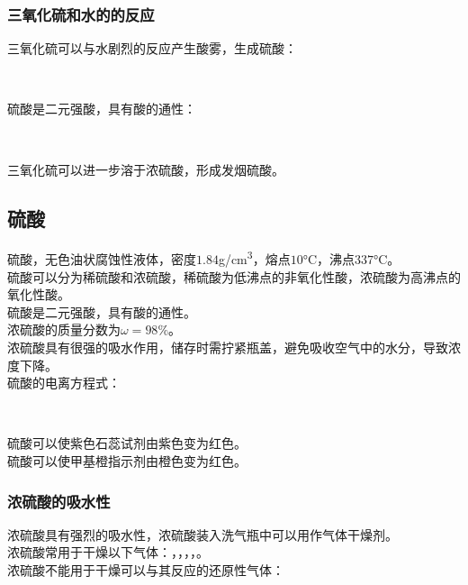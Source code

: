 \documentclass[UTF8]{ctexart}
\begin{document}
\subsubsection{三氧化硫和水的的反应}
    三氧化硫可以与水剧烈的反应产生酸雾，生成硫酸：
    \begin{center}
        \\[6mm]
    \end{center}
    硫酸是二元强酸，具有酸的通性：
    \begin{center}
        \\[6mm]
    \end{center}
    三氧化硫可以进一步溶于浓硫酸，形成发烟硫酸。

\newpage

\subsection{硫酸}
    硫酸，无色油状腐蚀性液体，密度$1.84$\si{g/cm^3}，熔点$10$\si{\degreeCelsius}，沸点$337$\si{\degreeCelsius}。\\[3mm]
    硫酸可以分为稀硫酸和浓硫酸，稀硫酸为低沸点的非氧化性酸，浓硫酸为高沸点的氧化性酸。\\[3mm]
    硫酸是二元强酸，具有酸的通性。\\[6mm]
    浓硫酸的质量分数为$\omega=98\%$。\\[3mm]
    浓硫酸具有很强的吸水作用，储存时需拧紧瓶盖，避免吸收空气中的水分，导致浓度下降。\\[6mm]
    硫酸的电离方程式：
    \begin{center}
        \\[4mm]
    \end{center}
    硫酸可以使紫色石蕊试剂由紫色变为红色。\\[3mm]
    硫酸可以使甲基橙指示剂由橙色变为红色。

\subsubsection{浓硫酸的吸水性}
    浓硫酸具有强烈的吸水性，浓硫酸装入洗气瓶中可以用作气体干燥剂。\\[3mm]
    浓硫酸常用于干燥以下气体：，，，，。\\[3mm]
    浓硫酸不能用于干燥可以与其反应的还原性气体：
    \begin{center}
        \\[3mm]
    \end{center}
\end{document}
